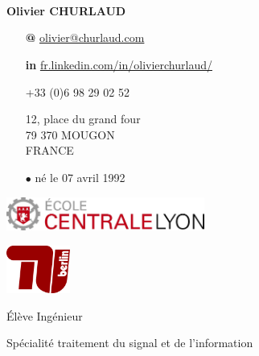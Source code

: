 \documentclass[skip,a4paper]{article}
\begin{document}
\fontsize{8.5}{9.5}
\selectfont

\begin{minipage}[c]{\linewidth}
	\begin{minipage}[c][4cm]{2.6cm}
		~\\~\\
		\vfill
		~
	\end{minipage}
	\begin{minipage}[c][4cm]{5.5cm}
		\textbf{Olivier CHURLAUD}

		\begin{itemize}[itemsep=0.5ex,leftmargin=3ex]
			\footnotesize
			\item[\bfseries @] \url{olivier@churlaud.com}
			\item[\bfseries \color{blue} in] {\scriptsize\url{ fr.linkedin.com/in/olivierchurlaud/}}
			\item[\Telefon]+33 (0)6 98 29 02 52
			\item[\Letter] 12, place du grand four \\
			79 370 MOUGON \\ 
			FRANCE
			\item[$\bullet$] né le 07 avril 1992
		\end{itemize}
	\end{minipage}
	\begin{minipage}[c][4cm]{10cm}
		\begin{minipage}[c]{7.10cm}
			\includegraphics[width=6.5cm]{img/ecl}
		\end{minipage}
		\hfill
		\begin{minipage}[c]{2.5cm}
			\includegraphics[width=2.1cm]{img/tuberlin}
		\end{minipage}
		
		\vfill
		
		\centering
		{
			\setlength{\parskip}{10pt plus 1pt minus 1pt}
			{\LARGE \'Elève Ingénieur}
			
			{\Large Spécialité traitement du signal et de l'information}
		}
	\end{minipage}
\end{minipage}
\end{document}

